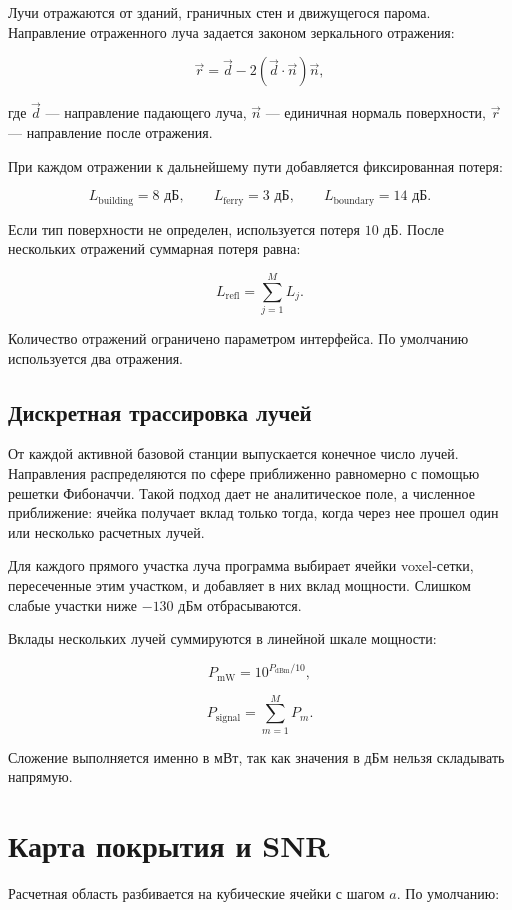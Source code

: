 \documentclass[12pt,a4paper]{article}
\begin{document}
Лучи отражаются от зданий, граничных стен и движущегося парома. Направление отраженного луча задается законом зеркального отражения:

\[
\vec r = \vec d - 2(\vec d \cdot \vec n)\vec n,
\]

где $\vec d$ --- направление падающего луча, $\vec n$ --- единичная нормаль поверхности, $\vec r$ --- направление после отражения.

При каждом отражении к дальнейшему пути добавляется фиксированная потеря:

\[
L_{\text{building}} = 8\text{ дБ}, \qquad
L_{\text{ferry}} = 3\text{ дБ}, \qquad
L_{\text{boundary}} = 14\text{ дБ}.
\]

Если тип поверхности не определен, используется потеря $10$ дБ. После нескольких отражений суммарная потеря равна:

\[
L_{\text{refl}} = \sum_{j=1}^{M} L_j.
\]

Количество отражений ограничено параметром интерфейса. По умолчанию используется два отражения.

\subsection{Дискретная трассировка лучей}

От каждой активной базовой станции выпускается конечное число лучей. Направления распределяются по сфере приближенно равномерно с помощью решетки Фибоначчи. Такой подход дает не аналитическое поле, а численное приближение: ячейка получает вклад только тогда, когда через нее прошел один или несколько расчетных лучей.

Для каждого прямого участка луча программа выбирает ячейки voxel-сетки, пересеченные этим участком, и добавляет в них вклад мощности. Слишком слабые участки ниже $-130$ дБм отбрасываются.

Вклады нескольких лучей суммируются в линейной шкале мощности:

\[
P_{\text{mW}} = 10^{P_{\text{dBm}}/10},
\]

\[
P_{\text{signal}} = \sum_{m=1}^{M}P_m.
\]

Сложение выполняется именно в мВт, так как значения в дБм нельзя складывать напрямую.

\section{Карта покрытия и SNR}

Расчетная область разбивается на кубические ячейки с шагом $a$. По умолчанию:
\end{document}

